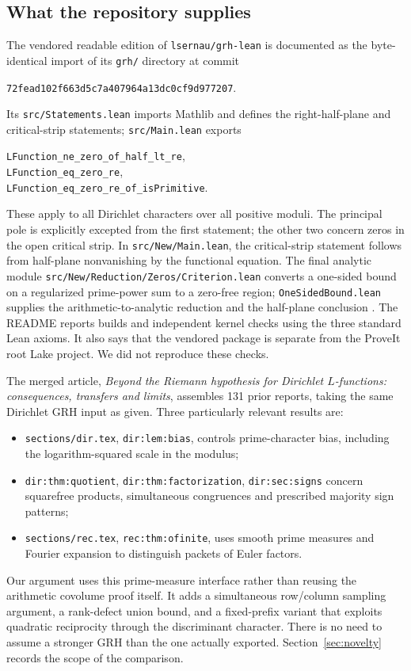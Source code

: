 \documentclass[11pt]{article}
\theoremstyle{remark}\newtheorem{remark}[theorem]{Remark}
\begin{document}
\subsection{What the repository supplies}
The vendored readable edition of \texttt{lsernau/grh-lean} is documented as the byte-identical import of its \texttt{grh/} directory at commit
\begin{center}\small\texttt{72fead102f663d5c7a407964a13dc0cf9d977207}.\end{center}
Its \texttt{src/Statements.lean} imports Mathlib and defines the right-half-plane and critical-strip statements; \texttt{src/Main.lean} exports
\begin{center}
\small\texttt{LFunction\_ne\_zero\_of\_half\_lt\_re},\\
\texttt{LFunction\_eq\_zero\_re},\\
\texttt{LFunction\_eq\_zero\_re\_of\_isPrimitive}.
\end{center}
These apply to all Dirichlet characters over all positive moduli. The principal pole is explicitly excepted from the first statement; the other two concern zeros in the open critical strip. In \texttt{src/New/Main.lean}, the critical-strip statement follows from half-plane nonvanishing by the functional equation. The final analytic module \texttt{src/New/Reduction/Zeros/Criterion.lean} converts a one-sided bound on a regularized prime-power sum to a zero-free region; \texttt{OneSidedBound.lean} supplies the arithmetic-to-analytic reduction and the half-plane conclusion \cite{vendor,article}. The README reports builds and independent kernel checks using the three standard Lean axioms. It also says that the vendored package is separate from the ProveIt root Lake project. We did not reproduce these checks.

The merged article, \emph{Beyond the Riemann hypothesis for Dirichlet $L$-functions: consequences, transfers and limits}, assembles 131 prior reports, taking the same Dirichlet GRH input as given. Three particularly relevant results are:
\begin{itemize}
\item \texttt{sections/dir.tex}, \texttt{dir:lem:bias}, controls prime-character bias, including the logarithm-squared scale in the modulus;
\item \texttt{dir:thm:quotient}, \texttt{dir:thm:factorization}, \texttt{dir:sec:signs} concern squarefree products, simultaneous congruences and prescribed majority sign patterns;
\item \texttt{sections/rec.tex}, \texttt{rec:thm:ofinite}, uses smooth prime measures and Fourier expansion to distinguish packets of Euler factors.
\end{itemize}
Our argument uses this prime-measure interface rather than reusing the arithmetic covolume proof itself. It adds a simultaneous row/column sampling argument, a rank-defect union bound, and a fixed-prefix variant that exploits quadratic reciprocity through the discriminant character. There is no need to assume a stronger GRH than the one actually exported. Section~\ref{sec:novelty} records the scope of the comparison.
\end{document}
